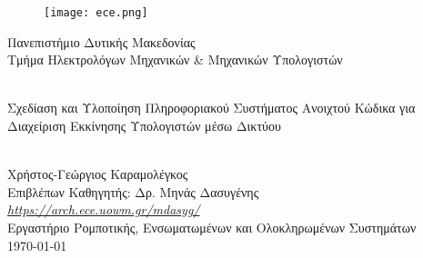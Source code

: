 
\begin{titlepage}
	\begin{center}
		\begin{figure}[h]
			\centering \texttt{[image: ece.png]}
		\end{figure}
		{\LARGE Πανεπιστήμιο Δυτικής Μακεδονίας\\}
		{\Large Τμήμα Ηλεκτρολόγων Μηχανικών \& Μηχανικών Υπολογιστών}

		\begin{center}
			\vspace{2cm}
			\HRule \\[0.4cm]
			{\huge Σχεδίαση και Υλοποίηση Πληροφοριακού Συστήματος Ανοιχτού Κώδικα για Διαχείριση Εκκίνησης Υπολογιστών μέσω Δικτύου\\}
			\HRule \\[0.4cm]
		\end{center}

		\vfill
		\begin{doublespacing}
			{\LARGE Χρήστος-Γεώργιος Καραμολέγκος\\}
			{\Large Επιβλέπων Καθηγητής: Δρ. Μηνάς Δασυγένης\\}
			{\Large \href{https://arch.ece.uowm.gr/mdasyg/}{\textit{https://arch.ece.uowm.gr/mdasyg/}}\\}
			{\Large Εργαστήριο Ρομποτικής, Ενσωματωμένων και Ολοκληρωμένων Συστημάτων\\}
			\vfill 
			{\Large \today}
		\end{doublespacing}
	\end{center}
	\newpage
	\thispagestyle{empty}
	\mbox{}
\end{titlepage}

